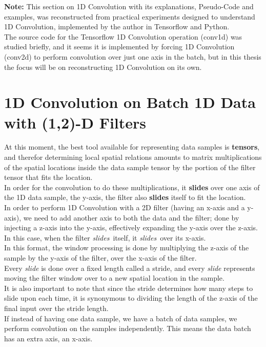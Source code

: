 \documentclass[a4paper, 12pt]{report}
\begin{document}
\textbf{Note:} This section on 1D Convolution with its explanations, Pseudo-Code and examples, was reconstructed from practical experiments designed to understand 1D Convolution, implemented by the author in Tensorflow and Python.\\
The source code for the Tensorflow 1D Convolution operation (conv1d) was studied briefly, and it seems it is implemented by forcing 1D Convolution (conv2d) to perform convolution over just one axis in the batch, but in this thesis the focus will be on reconstructing 1D Convolution on its own.\\
\section{\textbf{1D Convolution on Batch 1D Data with (1,2)-D Filters}}
At this moment, the best tool available for representing data samples is \textbf{tensors}, and therefor determining local spatial relations amounts to matrix multiplications of the spatial locations inside the data sample tensor by the portion of the filter tensor that fits the location.\\
In order for the convolution to do these multiplications, it \textbf{slides} over one axis of the 1D data sample, the y-axis, the filter also \textbf{slides} itself to fit the location.\\
In order to perform 1D Convolution with a 2D filter (having an x-axis and a y-axis), we need to add another axis to both the data and the filter; done by injecting a z-axis into the y-axis, effectively expanding the y-axis over the z-axis. In this case, when the filter \textit{slides}~itself, it \textit{slides}~over its x-axis.\\
In this format, the window processing is done by multiplying the z-axis of the sample by the y-axis of the filter, over the x-axis of the filter.\\
Every \textit{slide} is done over a fixed length called a stride, and every \textit{slide} represents moving the filter window over to a new spatial location in the sample.\\
It is also important to note that since the stride determines how many steps to slide upon each time, it is synonymous to dividing the length of the z-axis of the final input over the stride length.\\
If instead of having one data sample, we have a batch of data samples, we perform convolution on the samples independently. This means the data batch has an extra axis, an x-axis.\\
\end{document}

